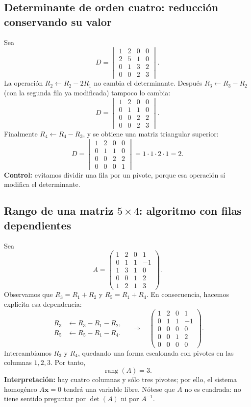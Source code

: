 \documentclass[12pt]{article}
\theoremstyle{remark}
\newcommand{\rang}{\operatorname{rang}}
\newcommand{\vect}[1]{\boldsymbol{#1}}
\begin{document}
\subsection{Determinante de orden cuatro: reducción conservando su valor}
Sea
\[
D=\begin{vmatrix}
1&2&0&0\\
2&5&1&0\\
0&1&3&2\\
0&0&2&3
\end{vmatrix}.
\]
La operación $R_2\leftarrow R_2-2R_1$ no cambia el determinante. Después $R_3\leftarrow R_3-R_2$ (con la segunda fila ya modificada) tampoco lo cambia:
\[
D=\begin{vmatrix}1&2&0&0\\0&1&1&0\\0&0&2&2\\0&0&2&3\end{vmatrix}.
\]
Finalmente $R_4\leftarrow R_4-R_3$, y se obtiene una matriz triangular superior:
\[
D=\begin{vmatrix}1&2&0&0\\0&1&1&0\\0&0&2&2\\0&0&0&1\end{vmatrix}
=1\cdot1\cdot2\cdot1=\boxed{2}.
\]
\textbf{Control:} evitamos dividir una fila por un pivote, porque esa operación sí modifica el determinante.

\subsection{Rango de una matriz $5\times4$: algoritmo con filas dependientes}
Sea
\[
A=\begin{pmatrix}
1&2&0&1\\0&1&1&-1\\1&3&1&0\\0&0&1&2\\1&2&1&3
\end{pmatrix}.
\]
Observamos que $R_3=R_1+R_2$ y $R_5=R_1+R_4$. En consecuencia, hacemos explícita esa dependencia:
\[
\begin{aligned}
R_3&\leftarrow R_3-R_1-R_2,\\
R_5&\leftarrow R_5-R_1-R_4.
\end{aligned}
\quad\Longrightarrow\quad
\begin{pmatrix}
1&2&0&1\\0&1&1&-1\\0&0&0&0\\0&0&1&2\\0&0&0&0
\end{pmatrix}.
\]
Intercambiamos $R_3$ y $R_4$, quedando una forma escalonada con pivotes en las columnas $1,2,3$. Por tanto,
\[\boxed{\rang(A)=3.}\]
\textbf{Interpretación:} hay cuatro columnas y sólo tres pivotes; por ello, el sistema homogéneo $A\vect x=0$ tendrá una variable libre. Nótese que $A$ no es cuadrada: no tiene sentido preguntar por $\det(A)$ ni por $A^{-1}$.
\end{document}
